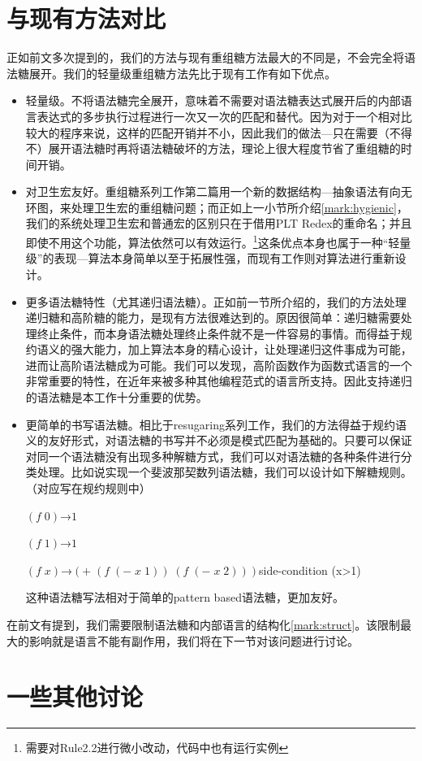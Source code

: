 \section{与现有方法对比}
正如前文多次提到的，我们的方法与现有重组糖方法最大的不同是，不会完全将语法糖展开。我们的轻量级重组糖方法先比于现有工作有如下优点。
\begin{itemize}
	\item 轻量级。不将语法糖完全展开，意味着不需要对语法糖表达式展开后的内部语言表达式的多步执行过程进行一次又一次的匹配和替代。因为对于一个相对比较大的程序来说，这样的匹配开销并不小，因此我们的做法---只在需要（不得不）展开语法糖时再将语法糖破坏的方法，理论上很大程度节省了重组糖的时间开销。
	\item 对卫生宏友好。重组糖系列工作第二篇用一个新的数据结构---抽象语法有向无环图，来处理卫生宏的重组糖问题；而正如上一小节所介绍\ref{mark:hygienic}，我们的系统处理卫生宏和普通宏的区别只在于借用PLT Redex的重命名；并且即使不用这个功能，算法依然可以有效运行。\footnote{需要对Rule2.2进行微小改动，代码中也有运行实例}这条优点本身也属于一种“轻量级”的表现---算法本身简单以至于拓展性强，而现有工作则对算法进行重新设计。
	\item 更多语法糖特性（尤其递归语法糖）。正如前一节所介绍的，我们的方法处理递归糖和高阶糖的能力，是现有方法很难达到的。原因很简单：递归糖需要处理终止条件，而本身语法糖处理终止条件就不是一件容易的事情。而得益于规约语义的强大能力，加上算法本身的精心设计，让处理递归这件事成为可能，进而让高阶语法糖成为可能。我们可以发现，高阶函数作为函数式语言的一个非常重要的特性，在近年来被多种其他编程范式的语言所支持。因此支持递归的语法糖是本工作十分重要的优势。
	\item 更简单的书写语法糖。相比于resugaring系列工作，我们的方法得益于规约语义的友好形式，对语法糖的书写并不必须是模式匹配为基础的。只要可以保证对同一个语法糖没有出现多种解糖方式，我们可以对语法糖的各种条件进行分类处理。比如说实现一个斐波那契数列语法糖，我们可以设计如下解糖规则。（对应写在规约规则中）
	
	$(f\;0)$→$1$
	
	$(f\;1)$→$1$
	
	$(f\;x)$→$(+\;(f\;(-\;x\;1))\;(f\;(-\;x\;2)))$\qquad side-condition (x>1)
	
	这种语法糖写法相对于简单的pattern based语法糖，更加友好。
\end{itemize}

在前文有提到，我们需要限制语法糖和内部语言的结构化\ref{mark:struct}。该限制最大的影响就是语言不能有副作用，我们将在下一节对该问题进行讨论。
\section{一些其他讨论}



